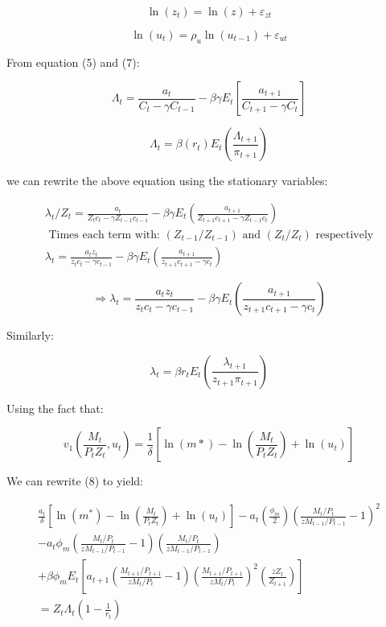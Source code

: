 \documentclass[11pt,preprint, authoryear]{elsarticle}
\numberwithin{equation}{section}
\numberwithin{figure}{section}
\numberwithin{table}{section}
\begin{document}
\[\ln \left(z_{t}\right)=\ln (z)+\varepsilon_{z t} \tag{3*}\]

\[\ln \left(u_{t}\right)=\rho_{u} \ln \left(u_{t-1}\right)+\varepsilon_{u t} \tag{4*} \]

From equation (5) and (7):

\[\Lambda_t = \frac{a_t}{C_t-\gamma C_{t-1}} - \beta \gamma E_t \left[ \frac{a_{t+1}}{C_{t+1} - \gamma C_t} \right] \tag{5}\]

\[\Lambda_t = \beta(r_t)E_t(\frac{\Lambda_{t+1}}{\pi_{t+1}}) \tag{7}\]

we can rewrite the above equation using the stationary variables:

\[\begin{aligned}
\lambda_{t} / Z_t =\frac{a_{t}}{Z_{t} c_{t}-\gamma Z_{t-1} c_{t-1}}-\beta \gamma E_{t} \left(\frac{a_{t+1}}{Z_{t+1} c_{t+1}-\gamma Z_{t-1} c_{t}} \right)\\
\text{ Times each term with: } \left(Z_{t-1} / Z_{t-1}\right) \text{ and } (Z_{t} / Z_{t}) \text{ respectively} \\
\lambda_{t} =\frac{a_{t} z_{t}}{z_{t} c_{t}-\gamma c_{t-1}}-\beta \gamma E_{t}\left(\frac{a_{t+1}}{z_{t+1} c_{t+1}-\gamma c_{t}}\right)
\end{aligned}\]

\[\Rightarrow \lambda_{t}=\frac{a_{t}z_{t}}{z_{t} c_{t}-\gamma c_{t-1}}-\beta \gamma E_{t}\left(\frac{a_{t+1}}{z_{t+1} c_{t+1}-\gamma c_{t}}\right) \tag{5*}\]

Similarly:

\[\lambda_{t}=\beta r_{t} E_{t}\left(\frac{\lambda_{t+1}}{z_{t+1} \pi_{t+1}}\right) \tag{7*}\]

Using the fact that:

\[v_1(\frac{M_t}{P_tZ_t},u_t) = \frac{1}{\delta}[\ln(m*) - \ln(\frac{M_t}{P_tZ_t}) + \ln(u_t)]\]

We can rewrite (8) to yield:

\[\begin{array}{l}
\frac{a_{t}}{\delta}\left[\ln \left(m^{*}\right)-\ln \left(\frac{M_{t}}{P_{t} Z_{t}}\right)+\ln \left(u_{t}\right)\right]-a_{t}\left(\frac{\phi_{m}}{2}\right)\left(\frac{M_{t} / P_{t}}{z M_{t-1} / P_{t-1}}-1\right)^{2} \\
-a_{t} \phi_{m}\left(\frac{M_{t} / P_{t}}{z M_{t-1} / P_{t-1}}-1\right)\left(\frac{M_{t} / P_{t}}{z M_{t-1} / P_{t-1}}\right) \\
+\beta \phi_{m} E_{t}\left[a_{t+1}\left(\frac{M_{t+1} / P_{t+1}}{z M_{t} / P_{t}}-1\right)\left(\frac{M_{t+1} / P_{t+1}}{z M_{t} / P_{t}}\right)^{2}\left(\frac{z Z_{t}}{Z_{t+1}}\right)\right] \\
=Z_{t} \Lambda_{t}\left(1-\frac{1}{r_{t}}\right)
\end{array} \tag{9}\]
\end{document}
